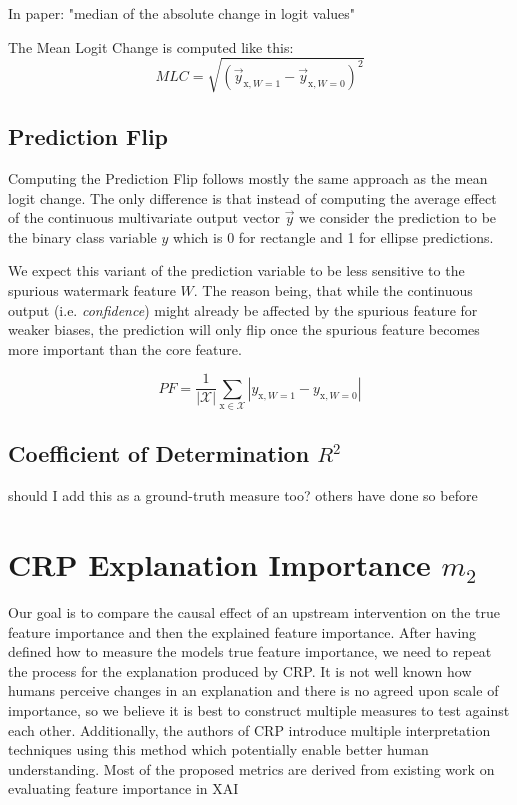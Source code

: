 In \cite{Sixt2022a} paper: "median of the absolute change in logit values"

The Mean Logit Change is computed like this:
\begin{equation}
\displaystyle 
MLC = \sqrt{(\vec{y}_{\mathrm{x}, W=1}- \vec{y}_{\mathrm{x}, W=0})^2}
\end{equation}

\subsection{Prediction Flip}
Computing the Prediction Flip follows mostly the same approach as the mean logit change. The only difference is that instead of computing the average effect of the continuous multivariate output vector $\vec{y}$ we consider the prediction to be the binary class variable $y$ which is 0 for rectangle and 1 for ellipse predictions. 

We expect this variant of the prediction variable to be less sensitive to the spurious watermark feature $W$. The reason being, that while the continuous output (i.e. \textit{confidence}) might already be affected by the spurious feature for weaker biases, the prediction will only flip once the spurious feature becomes more important than the core feature. 

\begin{equation}
\displaystyle 
PF =\frac{1}{|\mathcal{X}|} \sum_{\mathrm{x} \in \mathcal{X}} |y_{\mathrm{x}, W=1} - y_{\mathrm{x}, W=0} |
\end{equation}

\subsection{Coefficient of Determination $R^2$}
should I add this as a ground-truth measure too? others have done so before

\section{CRP Explanation Importance $m_2$}\label{section:measure}
Our goal is to compare the causal effect of an upstream intervention on the true feature importance and then the explained feature importance. After having defined how to measure the models true feature importance, we need to repeat the process for the explanation produced by CRP. It is not well known how humans perceive changes in an explanation and there is no agreed upon scale of importance, so we believe it is best to construct multiple measures to test against each other. {\color{gray} Additionally, the authors of CRP introduce multiple interpretation techniques using this method which potentially enable better human understanding. }Most of the proposed metrics are derived from existing work on evaluating feature importance in XAI \cite{Arras2022} \\

